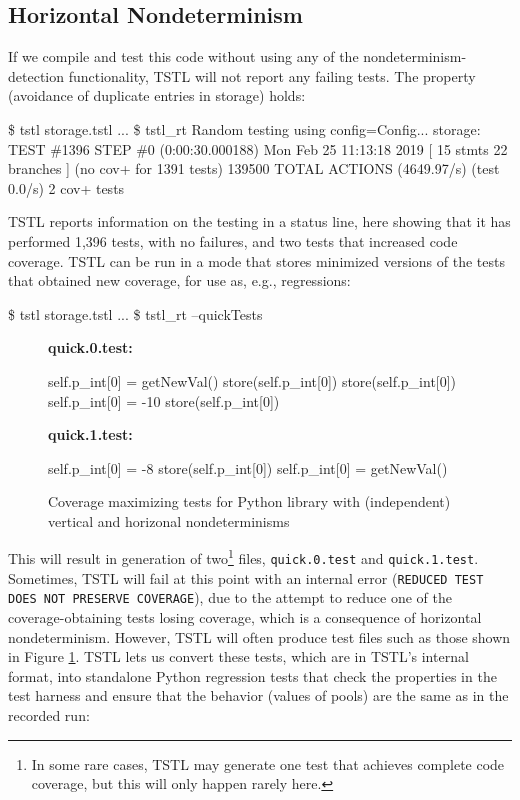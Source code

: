 \subsection{Horizontal Nondeterminism}

If we compile and test this code without using any of the
nondeterminism-detection functionality, TSTL will not report any
failing tests.  The property (avoidance of duplicate entries in
storage) holds:

{\scriptsize
\begin{code}
 \$ tstl storage.tstl
 ...
 \$ tstl\_rt
 Random testing using config=Config...
 storage: TEST \#1396 STEP \#0 (0:00:30.000188) Mon Feb
 25 11:13:18 2019 [ 15 stmts 22 branches ] (no cov+ for
 1391 tests) 139500 TOTAL ACTIONS (4649.97/s) (test
 0.0/s) 2 cov+ tests
\end{code}
}

TSTL reports information on the testing in a status line, here showing
that it has performed 1,396 tests, with no failures, and two tests
that increased code coverage.  TSTL can be run in a mode that stores
minimized versions of the tests that obtained new coverage, for use
as, e.g., regressions:

{\scriptsize
\begin{code}
 \$ tstl storage.tstl
 ...
 \$ tstl\_rt --quickTests
\end{code}
}

\begin{figure}
 {\scriptsize
{\bf quick.0.test:}
\begin{code}
self.p\_int[0] = getNewVal() 
store(self.p\_int[0]) 
store(self.p\_int[0]) 
self.p\_int[0] = -10 
store(self.p\_int[0]) 
\end{code}
\vspace{0.1in}
{\bf quick.1.test:}
\begin{code}
self.p\_int[0] = -8
store(self.p\_int[0]) 
self.p\_int[0] = getNewVal() 
\end{code}
}
\caption{Coverage maximizing tests for Python library with (independent) vertical and
  horizonal nondeterminisms}
\label{fig:simpleexampletests}
\end{figure}

This will result in generation of two\footnote{In some rare cases,
  TSTL may generate one test that achieves complete code coverage, but
  this will only happen rarely here.} files, {\tt quick.0.test} and
{\tt quick.1.test}.  Sometimes, TSTL will fail at this point with an internal error
({\tt REDUCED TEST DOES NOT PRESERVE COVERAGE}), due to the attempt to reduce one of the coverage-obtaining
tests losing coverage, which is a consequence of horizontal
nondeterminism.  However, TSTL will often produce
test files such as those shown in Figure
\ref{fig:simpleexampletests}.  TSTL lets us convert these tests, which
are in TSTL's internal format, into standalone Python regression tests
that check the properties in the test harness and ensure that the
behavior (values of pools) are the same as in the recorded run:

